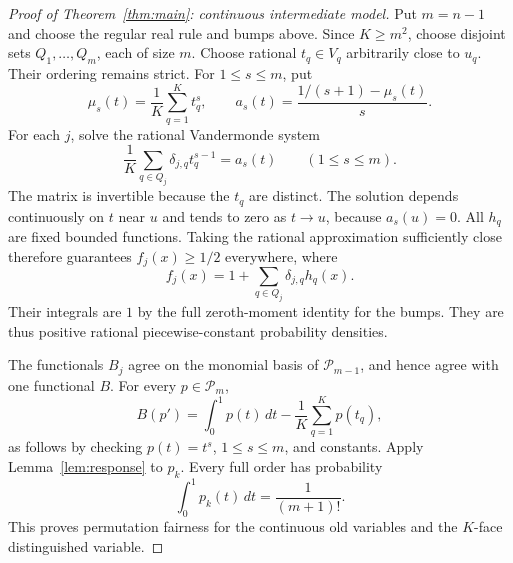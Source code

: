 \documentclass[11pt]{article}
\newcommand{\PP}{\mathcal P}
\begin{document}
\begin{proof}[Proof of Theorem~\ref{thm:main}: continuous intermediate model]
Put $m=n-1$ and choose the regular real rule and bumps above. Since
$K\ge m^2$, choose disjoint sets $Q_1,\ldots,Q_m$, each of size $m$.
Choose rational $t_q\in V_q$ arbitrarily close to $u_q$. Their ordering
remains strict. For $1\le s\le m$, put
\[
 \mu_s(t)=\frac1K\sum_{q=1}^Kt_q^s,\qquad
 a_s(t)=\frac{1/(s+1)-\mu_s(t)}s.
\]
For each $j$, solve the rational Vandermonde system
\[
 \frac1K\sum_{q\in Q_j}\delta_{j,q}t_q^{s-1}=a_s(t)
       \qquad(1\le s\le m).
\]
The matrix is invertible because the $t_q$ are distinct. The solution
depends continuously on $t$ near $u$ and tends to zero as $t\to u$,
because $a_s(u)=0$. All $h_q$ are fixed bounded functions. Taking the
rational approximation sufficiently close therefore guarantees
$f_j(x)\ge1/2$ everywhere, where
\[
 f_j(x)=1+\sum_{q\in Q_j}\delta_{j,q}h_q(x).
\]
Their integrals are $1$ by the full zeroth-moment identity for the bumps.
They are thus positive rational piecewise-constant probability densities.

The functionals $B_j$ agree on the monomial basis of $\PP_{m-1}$,
and hence agree with one functional $B$. For every $p\in\PP_m$,
\[
 B(p')=\int_0^1p(t)\,dt-\frac1K\sum_{q=1}^Kp(t_q),
\]
as follows by checking $p(t)=t^s$, $1\le s\le m$, and constants.
Apply Lemma~\ref{lem:response} to $p_k$. Every full order has probability
\[
 \int_0^1p_k(t)\,dt=\frac1{(m+1)!}.
\]
This proves permutation fairness for the continuous old variables and the
$K$-face distinguished variable.
\end{proof}
\end{document}
